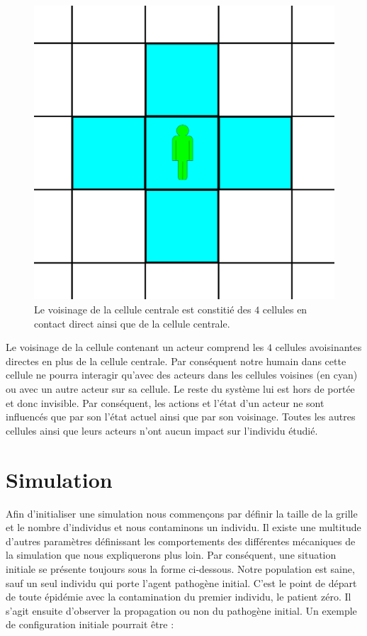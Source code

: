 \begin{figure}[h]
	\centering
	\captionsetup{justification=centering}
	\includegraphics[scale=0.5]{Images/voisinage.png}
	\caption[Voisinage d'une cellule]{Le voisinage de la cellule centrale est constitié des $4$ cellules en contact direct ainsi que de la cellule centrale.}
\end{figure}

Le voisinage de la cellule contenant un acteur comprend les $4$ cellules avoisinantes directes en plus de la cellule centrale. Par conséquent notre humain dans cette cellule ne pourra interagir qu'avec des acteurs dans les cellules voisines (en cyan) ou avec un autre acteur sur sa cellule. Le reste du système lui est hors de portée et donc invisible. Par conséquent, les actions et l'état d'un acteur ne sont influencés que par son l'état actuel ainsi que par son voisinage. Toutes les autres cellules ainsi que leurs acteurs n'ont aucun impact sur l'individu étudié.

\section{Simulation}

Afin d'initialiser une simulation nous commençons par définir la taille de la grille et le nombre d'individus et nous contaminons un individu. Il existe une multitude d'autres paramètres définissant les comportements des différentes mécaniques de la simulation que nous expliquerons plus loin. Par conséquent, une situation initiale se présente toujours sous la forme ci-dessous. Notre population est saine, sauf un seul individu qui porte l'agent pathogène initial. C'est le point de départ de toute épidémie avec la contamination du premier individu, le patient zéro. Il s'agit ensuite d'observer la propagation ou non du pathogène initial. Un exemple de configuration initiale pourrait être : \\

